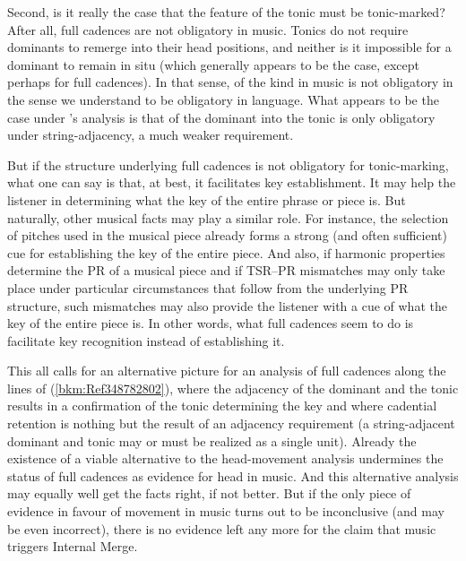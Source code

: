 \documentclass[output=paper]{langsci/langscibook}
\begin{document}
Second, is it really the case that the feature of the tonic must be
tonic-marked? After all, full cadences are not obligatory in music. Tonics do
not require dominants to remerge into their head positions, and neither is it
impossible for a dominant to remain in situ (which generally appears to be the
case, except perhaps for full cadences). In that sense,  of the
kind in music is not obligatory in the sense we understand  to be
obligatory in language. What appears to be the case under
\citeauthor{KatzPes2011}’s analysis is that  of the dominant into the
tonic is only obligatory under string-adjacency, a much weaker requirement.

But if the structure underlying full cadences is not obligatory for
tonic-mark\-ing, what one can say is that, at best, it facilitates key
establishment. It may help the listener in determining what the key of the
entire phrase or piece is. But naturally, other musical facts may play a
similar role. For instance, the selection of pitches used in the musical piece
already forms a strong (and often sufficient) cue for establishing the key of
the entire piece. And also, if harmonic properties determine the \gls{PR} of a
musical piece and if \gls{TSR}--\gls{PR} mismatches may only take place under
particular circumstances that follow from the underlying \gls{PR} structure,
such mismatches may also provide the listener with a cue of what the key of the
entire piece is. In other words, what full cadences seem to do is facilitate
key recognition instead of establishing it.

This all calls for an alternative picture for an analysis of full cadences
along the lines of (\ref{bkm:Ref348782802}), where the adjacency of the
dominant and the tonic results in a confirmation of the tonic determining the
key and where cadential retention is nothing but the result of an adjacency
requirement (a string-adjacent dominant and tonic may or must be realized as a
single unit). Already the existence of a viable alternative to the
head-movement analysis undermines the status of full cadences as evidence for
head  in music. And this alternative analysis may equally well get the
facts right, if not better. But if the only piece of evidence in favour of
movement in music turns out to be inconclusive (and may be even incorrect),
there is no evidence left any more for the claim that music triggers Internal
Merge.
\end{document}
